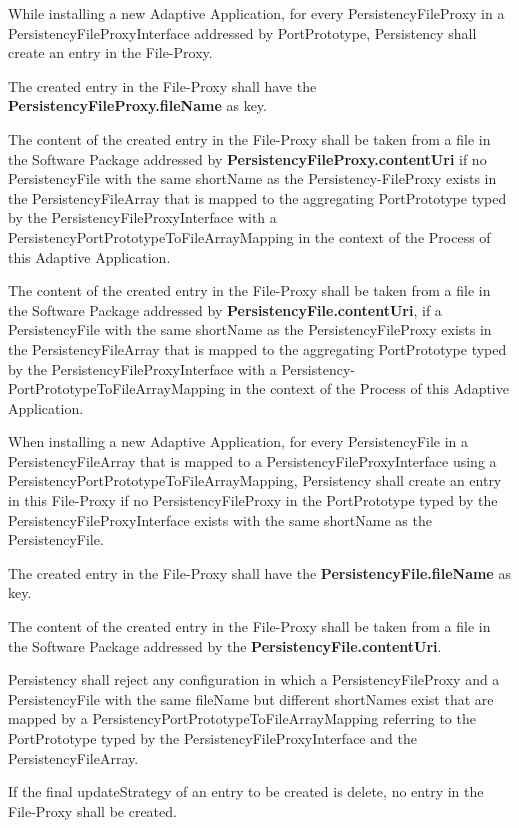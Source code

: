 \begin{DoxyItemize}
\item While installing a new Adaptive Application, for every Persistency\+File\+Proxy in a Persistency\+File\+Proxy\+Interface addressed by Port\+Prototype, Persistency shall create an entry in the File-\/\+Proxy.
\item The created entry in the File-\/\+Proxy shall have the {\bfseries Persistency\+File\+Proxy.\+file\+Name} as key.
\item The content of the created entry in the File-\/\+Proxy shall be taken from a file in the Software Package addressed by {\bfseries Persistency\+File\+Proxy.\+content\+Uri} if no Persistency\+File with the same short\+Name as the Persistency-\/\+File\+Proxy exists in the Persistency\+File\+Array that is mapped to the aggregating Port\+Prototype typed by the Persistency\+File\+Proxy\+Interface with a Persistency\+Port\+Prototype\+To\+File\+Array\+Mapping in the context of the Process of this Adaptive Application.
\item The content of the created entry in the File-\/\+Proxy shall be taken from a file in the Software Package addressed by {\bfseries Persistency\+File.\+content\+Uri}, if a Persistency\+File with the same short\+Name as the Persistency\+File\+Proxy exists in the Persistency\+File\+Array that is mapped to the aggregating Port\+Prototype typed by the Persistency\+File\+Proxy\+Interface with a Persistency-\/\+Port\+Prototype\+To\+File\+Array\+Mapping in the context of the Process of this Adaptive Application.
\item When installing a new Adaptive Application, for every Persistency\+File in a Persistency\+File\+Array that is mapped to a Persistency\+File\+Proxy\+Interface using a Persistency\+Port\+Prototype\+To\+File\+Array\+Mapping, Persistency shall create an entry in this File-\/\+Proxy if no Persistency\+File\+Proxy in the Port\+Prototype typed by the Persistency\+File\+Proxy\+Interface exists with the same short\+Name as the Persistency\+File.
\item The created entry in the File-\/\+Proxy shall have the {\bfseries Persistency\+File.\+file\+Name} as key.
\item The content of the created entry in the File-\/\+Proxy shall be taken from a file in the Software Package addressed by the {\bfseries Persistency\+File.\+content\+Uri}.
\item Persistency shall reject any configuration in which a Persistency\+File\+Proxy and a Persistency\+File with the same file\+Name but different short\+Names exist that are mapped by a Persistency\+Port\+Prototype\+To\+File\+Array\+Mapping referring to the Port\+Prototype typed by the Persistency\+File\+Proxy\+Interface and the Persistency\+File\+Array.
\item If the final update\+Strategy of an entry to be created is delete, no entry in the File-\/\+Proxy shall be created.
\end{DoxyItemize}

